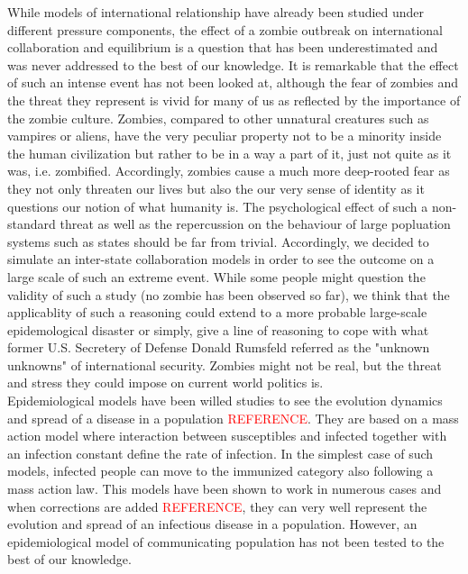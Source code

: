 \documentclass[11pt]{article}
\begin{document}
While models of international relationship have already been studied under different pressure components, the effect of a zombie outbreak on international collaboration and equilibrium is a question that has been underestimated and was never addressed to the best of our knowledge. It is remarkable that the effect of such an intense event has not been looked at, although the fear of zombies and the threat they represent is vivid for many of us as reflected by the importance of the zombie culture. Zombies, compared to other unnatural creatures such as vampires or aliens, have the very peculiar property not to be a minority inside the human civilization but rather to be in a way a part of it, just not quite as it was, i.e. zombified. Accordingly, zombies cause a much more deep-rooted fear as they not only threaten our lives but also the our very sense of identity as it questions our notion of what humanity is. The psychological effect of such a non-standard threat as well as the repercussion on the behaviour of large popluation systems such as states should be far from trivial. Accordingly, we decided to simulate an inter-state collaboration models in order to see the outcome on a large scale of such an extreme event. While some people might question the validity of such a study (no zombie has been observed so far), we think that the applicablity of such a reasoning could extend to a more probable large-scale epidemological disaster or simply, give a line of reasoning to cope with what former U.S. Secretery of Defense Donald Rumsfeld referred as the "unknown unknowns" of international security. Zombies might not be real, but the threat and stress they could impose on current world politics is. \\

Epidemiological models have been willed studies to see the evolution dynamics and spread of a disease in a population \textcolor{red}{REFERENCE}. They are based on a mass action model where interaction between susceptibles and infected together with an infection constant define the rate of infection. In the simplest case of such models, infected people can move to the immunized category also following a mass action law. This models have been shown to work in numerous cases and  when corrections are added \textcolor{red}{REFERENCE}, they can very well represent the evolution and spread of an infectious disease in a population. However, an epidemiological model of communicating population has not been tested to the best of our knowledge. \\
\end{document}
